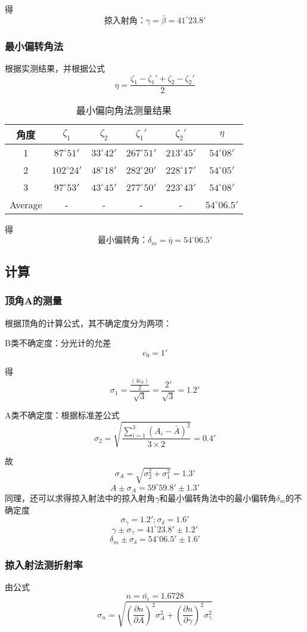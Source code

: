 \documentclass{ctexart}
\begin{document}
  得$$\mbox{掠入射角：}\gamma=\bar{\beta}=41^\circ 23.8'$$
\subsubsection{最小偏转角法}
根据实测结果，并根据公式$$\eta=\frac{\zeta_1-\zeta_1'+\zeta_2-\zeta_2'}{2}$$
\begin{table}[H]
  \centering
  \caption{最小偏向角法测量结果}
    \begin{tabular}{|c|c|c|c|c|c|}\hline
    角度    &{$\zeta_1$} &{$\zeta_2$} &{$\zeta_1'$} &{$\zeta_2'$} &{$\eta$} \\\hline
   {1} & $87^\circ 51'$ & $33^\circ 42'$ & $267^\circ 51'$ & $213^\circ 45'$ & $54^\circ 08'$ \\\hline
   {2} & $102^\circ 24'$ & $48^\circ 18'$ & $282^\circ 20'$ & $228^\circ 17'$ & $54^\circ 05'$ \\\hline
   {3} & $97^\circ 53'$ & $43^\circ 45'$ & $277^\circ 50'$ & $223^\circ 43'$ & $54^\circ 08'$ \\\hline
    Average &-& -&-&-&$54^\circ 06.5'$ \\\hline
    \end{tabular}%
  \label{tab:addlabel}%
\end{table}%

  得$$\mbox{最小偏转角：}\delta_m=\bar{\eta}=54^\circ 06.5'$$
  \subsection{计算}
  \subsubsection{顶角A的测量}
  根据顶角的计算公式，其不确定度分为两项：

  B类不确定度：分光计的允差$$e_0={1'}$$
  
  得$$\sigma_1=\frac{\frac{(4e_0)}{2}}{\sqrt{3}}=\frac{2'}{\sqrt{3}}=1.2'$$
  
  A类不确定度：根据标准差公式$$\sigma_2=\sqrt{\frac{\sum\limits_{i=1}^{3}{(A_i-\bar{A})^2}}{3\times2}}=0.4'$$

  故$$\sigma_A=\sqrt{\sigma_2^2+\sigma_1^2}=1.3'$$
  $$A\pm \sigma_A=59^\circ59.8'\pm1.3'$$
  同理，还可以求得掠入射法中的掠入射角$\gamma$和最小偏转角法中的最小偏转角$\delta_m$的不确定度
  $$\sigma_{\gamma}=1.2';\sigma_{\delta}=1.6'$$
  $$\gamma\pm\sigma_{\gamma}=41^\circ23.8'\pm 1.2'$$
  $$\delta_{m}\pm\sigma_{\delta}=54^\circ06.5'\pm 1.6'$$
  \subsubsection{掠入射法测折射率}
  由公式$$n=\bar{n_i}=1.6728$$
  $$\sigma_n=\sqrt{(\frac{\partial n}{\partial A})^2\sigma_A^2+(\frac{\partial n}{\partial \gamma})^2\sigma_{\gamma}^2}$$
  
\end{document}
